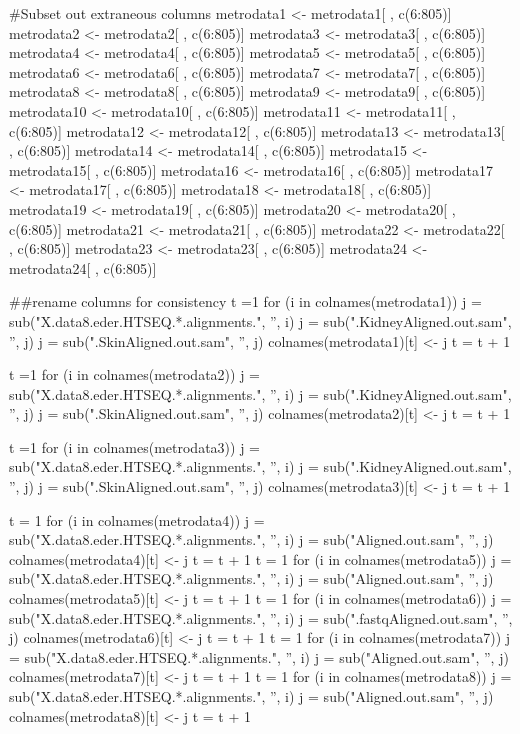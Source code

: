 \documentclass[10pt]{article}
\begin{document}
#Subset out extraneous columns
metrodata1 <- metrodata1[ , c(6:805)]
metrodata2 <- metrodata2[ , c(6:805)]
metrodata3 <- metrodata3[ , c(6:805)]
metrodata4 <- metrodata4[ , c(6:805)]
metrodata5 <- metrodata5[ , c(6:805)]
metrodata6 <- metrodata6[ , c(6:805)]
metrodata7 <- metrodata7[ , c(6:805)]
metrodata8 <- metrodata8[ , c(6:805)]
metrodata9 <- metrodata9[ , c(6:805)]
metrodata10 <- metrodata10[ , c(6:805)]
metrodata11 <- metrodata11[ , c(6:805)]
metrodata12 <- metrodata12[ , c(6:805)]
metrodata13 <- metrodata13[ , c(6:805)]
metrodata14 <- metrodata14[ , c(6:805)]
metrodata15 <- metrodata15[ , c(6:805)]
metrodata16 <- metrodata16[ , c(6:805)]
metrodata17 <- metrodata17[ , c(6:805)]
metrodata18 <- metrodata18[ , c(6:805)]
metrodata19 <- metrodata19[ , c(6:805)]
metrodata20 <- metrodata20[ , c(6:805)]
metrodata21 <- metrodata21[ , c(6:805)]
metrodata22 <- metrodata22[ , c(6:805)]
metrodata23 <- metrodata23[ , c(6:805)]
metrodata24 <- metrodata24[ , c(6:805)]

##rename columns for consistency
t =1
for (i in colnames(metrodata1)){
  j = sub("X.data8.eder.HTSEQ.*.alignments.", '', i)
  j = sub(".KidneyAligned.out.sam", '', j)
  j = sub(".SkinAligned.out.sam", '', j)
  colnames(metrodata1)[t] <- j
  t = t + 1
}

t =1
for (i in colnames(metrodata2)){
  j = sub("X.data8.eder.HTSEQ.*.alignments.", '', i)
  j = sub(".KidneyAligned.out.sam", '', j)
  j = sub(".SkinAligned.out.sam", '', j)
  colnames(metrodata2)[t] <- j
  t = t + 1
}

t =1
for (i in colnames(metrodata3)){
  j = sub("X.data8.eder.HTSEQ.*.alignments.", '', i)
  j = sub(".KidneyAligned.out.sam", '', j)
  j = sub(".SkinAligned.out.sam", '', j)
  colnames(metrodata3)[t] <- j
  t = t + 1
}

t = 1
for (i in colnames(metrodata4)){
  j = sub("X.data8.eder.HTSEQ.*.alignments.", '', i)
  j = sub("Aligned.out.sam", '', j)
  colnames(metrodata4)[t] <- j
  t = t + 1
}
t = 1
for (i in colnames(metrodata5)){
  j = sub("X.data8.eder.HTSEQ.*.alignments.", '', i)
  j = sub("Aligned.out.sam", '', j)
  colnames(metrodata5)[t] <- j
  t = t + 1
}
t = 1
for (i in colnames(metrodata6)){
  j = sub("X.data8.eder.HTSEQ.*.alignments.", '', i)
  j = sub(".fastqAligned.out.sam", '', j)
  colnames(metrodata6)[t] <- j
  t = t + 1
}
t = 1
for (i in colnames(metrodata7)){
  j = sub("X.data8.eder.HTSEQ.*.alignments.", '', i)
  j = sub("Aligned.out.sam", '', j)
  colnames(metrodata7)[t] <- j
  t = t + 1
}
t = 1
for (i in colnames(metrodata8)){
  j = sub("X.data8.eder.HTSEQ.*.alignments.", '', i)
  j = sub("Aligned.out.sam", '', j)
  colnames(metrodata8)[t] <- j
  t = t + 1
}
\end{document}
